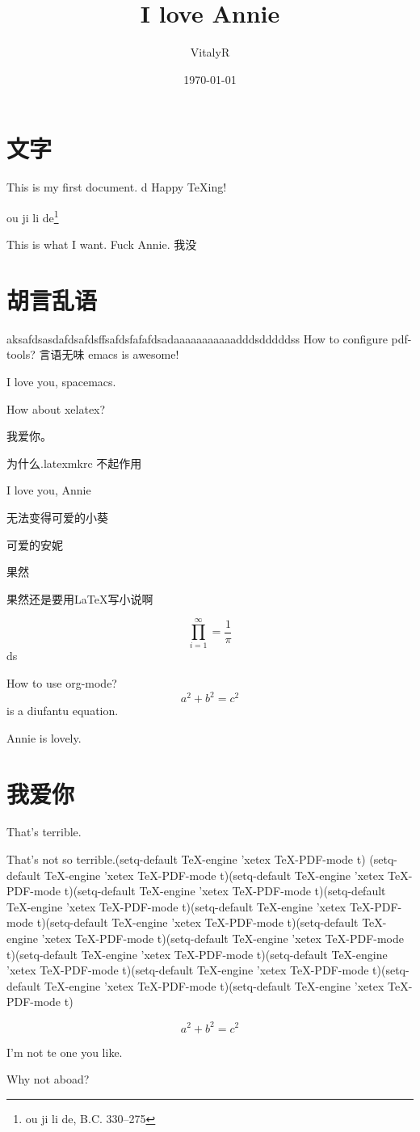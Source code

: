 \documentclass[UTF8]{ctexart}
\title{I love Annie}
\author{VitalyR}
\date{\today}
\begin{document}
\maketitle
\tableofcontents

\section{文字}
This is my first document.
d
Happy \TeX ing!

ou ji li de\footnote{ou ji li de, B.C. 330--275}

This is what I want.
Fuck Annie.
我没 

\section{胡言乱语}

aksafdsasdafdsafdsffsafdsfafafdsadaaaaaaaaaaadddsdddddss
How to configure pdf-tools?
言语无味
emacs is awesome!

I love you, spacemacs.


How about xelatex?

我爱你。

为什么.latexmkrc 不起作用

I love you, Annie

无法变得可爱的小葵

可爱的安妮

果然

果然还是要用\LaTeX 写小说啊


\begin{equation}
  \prod_{i=1}^{\infty}=\frac{1}{\pi}
  \end{equation}
  ds

How to use org-mode?
\[a^{2}+b^{2}=c^{2}\] is a diufantu equation.


Annie is lovely.




\section{我爱你}
That's terrible.

That's not so terrible.(setq-default TeX-engine 'xetex
              TeX-PDF-mode t)
(setq-default TeX-engine 'xetex
              TeX-PDF-mode t)(setq-default TeX-engine 'xetex
              TeX-PDF-mode t)(setq-default TeX-engine 'xetex
              TeX-PDF-mode t)(setq-default TeX-engine 'xetex
              TeX-PDF-mode t)(setq-default TeX-engine 'xetex
              TeX-PDF-mode t)(setq-default TeX-engine 'xetex
              TeX-PDF-mode t)(setq-default TeX-engine 'xetex
              TeX-PDF-mode t)(setq-default TeX-engine 'xetex
              TeX-PDF-mode t)(setq-default TeX-engine 'xetex
              TeX-PDF-mode t)(setq-default TeX-engine 'xetex
              TeX-PDF-mode t)(setq-default TeX-engine 'xetex
              TeX-PDF-mode t)(setq-default TeX-engine 'xetex
              TeX-PDF-mode t)(setq-default TeX-engine 'xetex
              TeX-PDF-mode t)

\begin{equation}
\label{eq:2}
a^{2}+b^{2}=c^{2}
\end{equation}


I'm not te one you like.

Why not aboad?
\end{document}
